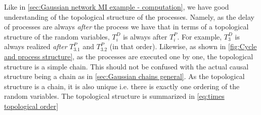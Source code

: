 \documentclass[../Thesis.tex]{subfiles}
\begin{document}
Like in \autoref{sec:Gaussian network MI example - computation}, we have good understanding of the topological structure of the processes. Namely, as the delay of processes are always \textit{after} the process we have that in terms of a topological structure of the random variables, $T^D_i$ is always after $T^P_i$. For example, $T^D_3$ is always realized \textit{after} $T^P_{3.1}$ and $T^P_{3.2}$ (in that order). Likewise, as shown in \autoref{fig:Cycle and process structure}, as the processes are executed one by one, the topological structure is a simple chain. This should not be confused with the actual causal structure being a chain as in \autoref{sec:Gaussian chains general}. As the topological structure is a chain, it is also unique i.e. there is exactly one ordering of the random variables. The topological structure is summarized in \autoref{eq:times topological order}
\newpage
\end{document}
